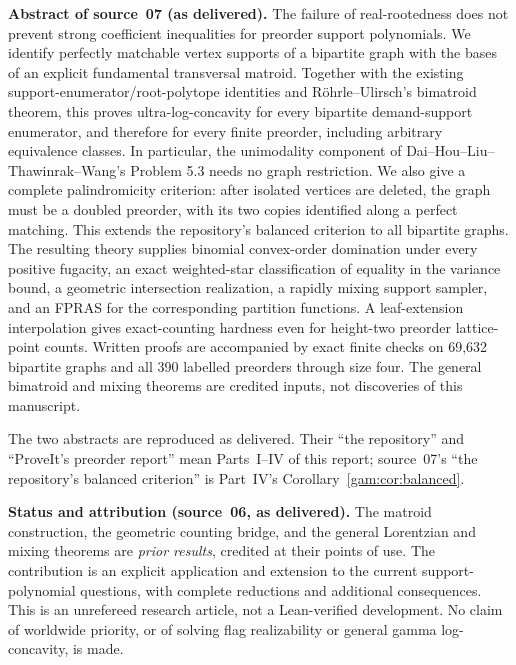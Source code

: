 \documentclass[11pt]{article}
\numberwithin{equation}{section}
\theoremstyle{definition}
\begin{document}
\begin{tcolorbox}[colback=white,colframe=Pale,arc=1mm]
\small\textbf{Abstract of source~07 (as delivered).}
The failure of real-rootedness does not prevent strong coefficient inequalities
for preorder support polynomials. We identify perfectly matchable vertex
supports of a bipartite graph with the bases of an explicit fundamental
transversal matroid. Together with the existing support-enumerator/root-polytope
identities and R\"ohrle--Ulirsch's bimatroid theorem, this proves ultra-log-concavity
for every bipartite demand-support enumerator, and therefore for every finite
preorder, including arbitrary equivalence classes. In particular, the unimodality
component of Dai--Hou--Liu--Thawinrak--Wang's Problem 5.3 needs no graph
restriction. We also give a complete palindromicity criterion: after isolated
vertices are deleted, the graph must be a doubled preorder, with its two copies
identified along a perfect matching. This extends the repository's balanced
criterion to all bipartite graphs. The resulting theory supplies binomial
convex-order domination under every positive fugacity, an exact weighted-star
classification of equality in the variance bound, a geometric intersection
realization, a rapidly mixing support sampler, and an FPRAS for the corresponding
partition functions. A leaf-extension interpolation gives exact-counting
hardness even for height-two preorder lattice-point counts. Written proofs are
accompanied by exact finite checks on 69,632 bipartite graphs and all 390 labelled
preorders through size four. The general bimatroid and mixing theorems are
credited inputs, not discoveries of this manuscript.
\end{tcolorbox}
\noindent The two abstracts are reproduced as delivered. Their ``the
repository'' and ``ProveIt's preorder report'' mean Parts~I--IV of this
report; source~07's ``the repository's balanced criterion'' is Part~IV's
Corollary~\ref{gam:cor:balanced}.

\begin{statusbox}
\small\textbf{Status and attribution (source~06, as delivered).}
The matroid construction, the geometric
counting bridge, and the general Lorentzian and mixing theorems are
\emph{prior results}, credited at their points of use. The contribution is
an explicit application and extension to the current support-polynomial
questions, with complete reductions and additional consequences. This is
an unrefereed research article, not a Lean-verified development. No claim of
worldwide priority, or of solving flag realizability or general gamma
log-concavity, is made.
\end{statusbox}
\end{document}
